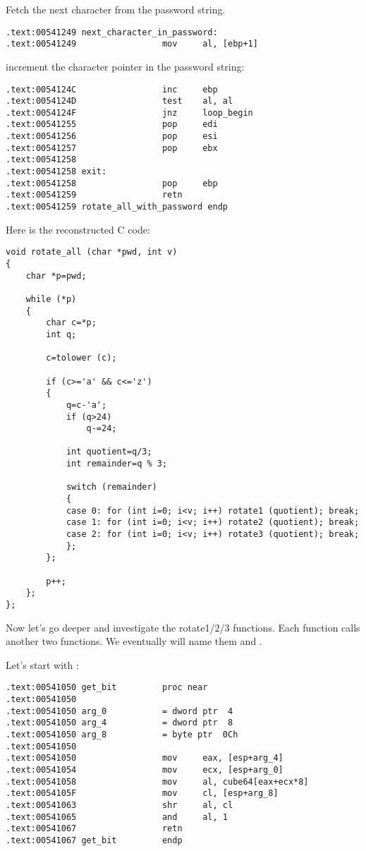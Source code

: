 Fetch the next character from the password string.

\begin{lstlisting}[style=customasmx86]
.text:00541249 next_character_in_password:
.text:00541249                 mov     al, [ebp+1]
\end{lstlisting}

\Gls{increment} the character pointer in the password string:

\begin{lstlisting}[style=customasmx86]
.text:0054124C                 inc     ebp
.text:0054124D                 test    al, al
.text:0054124F                 jnz     loop_begin
.text:00541255                 pop     edi
.text:00541256                 pop     esi
.text:00541257                 pop     ebx
.text:00541258
.text:00541258 exit:
.text:00541258                 pop     ebp
.text:00541259                 retn
.text:00541259 rotate_all_with_password endp
\end{lstlisting}

Here is the reconstructed C code:

\begin{lstlisting}[style=customc]
void rotate_all (char *pwd, int v)
{
	char *p=pwd;

	while (*p)
	{
		char c=*p;
		int q;

		c=tolower (c);

		if (c>='a' && c<='z')
		{
			q=c-'a';
			if (q>24)
				q-=24;

			int quotient=q/3;
			int remainder=q % 3;

			switch (remainder)
			{
			case 0: for (int i=0; i<v; i++) rotate1 (quotient); break;
			case 1: for (int i=0; i<v; i++) rotate2 (quotient); break;
			case 2: for (int i=0; i<v; i++) rotate3 (quotient); break;
			};
		};

		p++;
	};
};
\end{lstlisting}

Now let's go deeper and investigate the rotate1/2/3 functions. 
Each function calls another two functions. 
We eventually will name them  and .

Let's start with :

\begin{lstlisting}[style=customasmx86]
.text:00541050 get_bit         proc near
.text:00541050
.text:00541050 arg_0           = dword ptr  4
.text:00541050 arg_4           = dword ptr  8
.text:00541050 arg_8           = byte ptr  0Ch
.text:00541050
.text:00541050                 mov     eax, [esp+arg_4]
.text:00541054                 mov     ecx, [esp+arg_0]
.text:00541058                 mov     al, cube64[eax+ecx*8]
.text:0054105F                 mov     cl, [esp+arg_8]
.text:00541063                 shr     al, cl
.text:00541065                 and     al, 1
.text:00541067                 retn
.text:00541067 get_bit         endp
\end{lstlisting}

